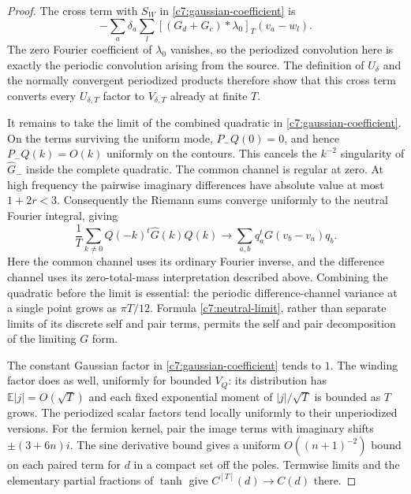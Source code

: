 \begin{proof}
The cross term with $S_W$ in \eqref{c7:gaussian-coefficient} is
\[
-\sum_a\delta_a\sum_l
 [(G_d+G_c)*\lambda_0]_T(v_a-w_l).
\]
The zero Fourier coefficient of $\lambda_0$ vanishes, so the periodized convolution here is exactly the periodic convolution arising from the source. The definition of $U_\delta$ and the normally convergent periodized products therefore show that this cross term converts every $U_{\delta,T}$ factor to $V_{\delta,T}$ already at finite $T$.

It remains to take the limit of the combined quadratic in \eqref{c7:gaussian-coefficient}. On the terms surviving the uniform mode, $P_-Q(0)=0$, and hence $P_-Q(k)=O(k)$ uniformly on the contours. This cancels the $k^{-2}$ singularity of $\widehat G_-$ inside the complete quadratic. The common channel is regular at zero. At high frequency the pairwise imaginary differences have absolute value at most $1+2r<3$. Consequently the Riemann sums converge uniformly to the neutral Fourier integral, giving
\begin{equation}\label{c7:neutral-limit}
\frac1T\sum_{k\ne0}Q(-k)^t\widehat G(k)Q(k)
\longrightarrow
\sum_{a,b}q_a^tG(v_b-v_a)q_b.
\end{equation}
Here the common channel uses its ordinary Fourier inverse, and the difference channel uses its zero-total-mass interpretation described above. Combining the quadratic before the limit is essential: the periodic difference-channel variance at a single point grows as $\pi T/12$. Formula \eqref{c7:neutral-limit}, rather than separate limits of its discrete self and pair terms, permits the self and pair decomposition of the limiting $G$ form.

The constant Gaussian factor in \eqref{c7:gaussian-coefficient} tends to $1$. The winding factor does as well, uniformly for bounded $V_Q$: its distribution has $\mathbb E|j|=O(\sqrt T)$ and each fixed exponential moment of $|j|/\sqrt T$ is bounded as $T$ grows. The periodized scalar factors tend locally uniformly to their unperiodized versions. For the fermion kernel, pair the image terms with imaginary shifts $\pm(3+6n)i$. The sine derivative bound gives a uniform $O((n+1)^{-2})$ bound on each paired term for $d$ in a compact set off the poles. Termwise limits and the elementary partial fractions of $\tanh$ give $C^{[T]}(d)\to C(d)$ there.


\end{proof}
